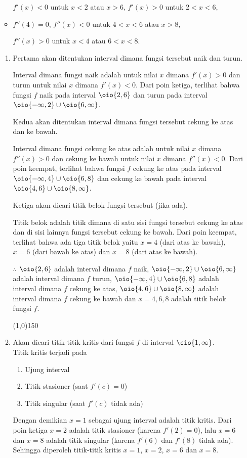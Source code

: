 \begin{enumerate}[leftmargin=*, label={\arabic*}.]
\begin{itemize}
    $f'(x)<0$ untuk $x < 2$ atau $x>6$, $f'(x)>0$ untuk $2<x<6$,
    \item $f''(4) = 0$, $f''(x)<0$ untuk $4<x<6$ atau $x > 8$,
    
    $f''(x)>0$ untuk $x<4$ atau $6 < x < 8$.
\end{itemize}
\begin{enumerate}[label={\alph*}.]
    \item Pertama akan ditentukan interval dimana fungsi tersebut naik dan turun.
    
    Interval dimana fungsi naik adalah untuk nilai $x$ dimana $f'(x) > 0$ dan turun 
    untuk nilai $x$ dimana $f'(x) < 0$. Dari poin ketiga, terlihat bahwa fungsi $f$ 
    naik pada interval $\oio{2,6}$ dan turun pada interval 
    $\oio{-\infty,2} \cup \oio{6,\infty}$.
    
    Kedua akan ditentukan interval dimana fungsi tersebut cekung ke atas dan ke bawah.

    Interval dimana fungsi cekung ke atas adalah untuk nilai $x$ dimana $f''(x) > 0$ 
    dan cekung ke bawah untuk nilai $x$ dimana $f''(x) < 0$. Dari poin keempat, terlihat 
    bahwa fungsi $f$ cekung ke atas pada interval 
    $\oio{-\infty,4} \cup \oio{6,8}$ dan cekung ke bawah pada interval 
    $\oio{4,6} \cup \oio{8,\infty}$.

    Ketiga akan dicari titik belok fungsi tersebut (jika ada).

    Titik belok adalah titik dimana di satu sisi fungsi tersebut cekung ke atas dan 
    di sisi lainnya fungsi tersebut cekung ke bawah. Dari poin keempat, terlihat bahwa 
    ada tiga titik belok yaitu $x=4$ (dari atas ke bawah), $x=6$ (dari bawah ke atas) 
    dan $x=8$ (dari atas ke bawah).

    $\therefore$ $\oio{2,6}$ adalah interval dimana $f$ naik, 
    $\oio{-\infty,2} \cup \oio{6,\infty}$ adalah interval dimana $f$ 
    turun, $\oio{-\infty,4} \cup \oio{6,8}$ adalah interval dimana $f$ 
    cekung ke atas, $\oio{4,6} \cup \oio{8,\infty}$ adalah interval 
    dimana $f$ cekung ke bawah dan $x=4,6,8$ adalah titik belok fungsi $f$.
\begin{center}
    \line(1,0){150}
\end{center}
    \item Akan dicari titik-titik kritis dari fungsi $f$ di interval $\cio{1,\infty}$.\\
    Titik kritis terjadi pada
    \begin{enumerate}[label={\arabic*})]
        \item Ujung interval
        \item Titik stasioner (saat $f'(c)=0$)
        \item Titik singular (saat $f'(c)$ tidak ada)
    \end{enumerate}
    Dengan demikian $x=1$ sebagai ujung interval adalah titik kritis. Dari poin ketiga $x=2$ 
    adalah titik stasioner (karena $f'(2)=0$), lalu $x=6$ dan $x=8$ adalah titik singular 
    (karena $f'(6)$ dan $f'(8)$ tidak ada). Sehingga diperoleh titik-titik kritis $x=1$, $x=2$, 
    $x=6$ dan $x=8$.


\end{enumerate}
\end{enumerate}
